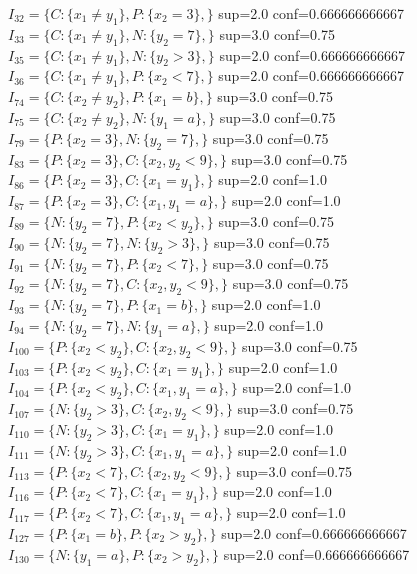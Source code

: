 \documentclass[11pt,a4paper]{article}
\theoremstyle{definition}
\begin{document}
       $I_{32}=\{C:\{x_{1}\neq y_{1}\},P:\{x_{2}=3\},\}$  sup=2.0 conf=0.666666666667\\
       $I_{33}=\{C:\{x_{1}\neq y_{1}\},N:\{y_{2}=7\},\}$  sup=3.0 conf=0.75\\
       $I_{35}=\{C:\{x_{1}\neq y_{1}\},N:\{y_{2}>3\},\}$  sup=2.0 conf=0.666666666667\\
       $I_{36}=\{C:\{x_{1}\neq y_{1}\},P:\{x_{2}<7\},\}$  sup=2.0 conf=0.666666666667\\
       $I_{74}=\{C:\{x_{2}\neq y_{2}\},P:\{x_{1}=b\},\}$  sup=3.0 conf=0.75\\
       $I_{75}=\{C:\{x_{2}\neq y_{2}\},N:\{y_{1}=a\},\}$  sup=3.0 conf=0.75\\
       $I_{79}=\{P:\{x_{2}=3\},N:\{y_{2}=7\},\}$  sup=3.0 conf=0.75\\
       $I_{83}=\{P:\{x_{2}=3\},C:\{x_{2},y_{2}<9\},\}$  sup=3.0 conf=0.75\\
       $I_{86}=\{P:\{x_{2}=3\},C:\{x_{1}=y_{1}\},\}$  sup=2.0 conf=1.0\\
       $I_{87}=\{P:\{x_{2}=3\},C:\{x_{1},y_{1}=a\},\}$  sup=2.0 conf=1.0\\
       $I_{89}=\{N:\{y_{2}=7\},P:\{x_{2}<y_{2}\},\}$  sup=3.0 conf=0.75\\
       $I_{90}=\{N:\{y_{2}=7\},N:\{y_{2}>3\},\}$  sup=3.0 conf=0.75\\
       $I_{91}=\{N:\{y_{2}=7\},P:\{x_{2}<7\},\}$  sup=3.0 conf=0.75\\
       $I_{92}=\{N:\{y_{2}=7\},C:\{x_{2},y_{2}<9\},\}$  sup=3.0 conf=0.75\\
       $I_{93}=\{N:\{y_{2}=7\},P:\{x_{1}=b\},\}$  sup=2.0 conf=1.0\\
       $I_{94}=\{N:\{y_{2}=7\},N:\{y_{1}=a\},\}$  sup=2.0 conf=1.0\\
       $I_{100}=\{P:\{x_{2}<y_{2}\},C:\{x_{2},y_{2}<9\},\}$  sup=3.0 conf=0.75\\
       $I_{103}=\{P:\{x_{2}<y_{2}\},C:\{x_{1}=y_{1}\},\}$  sup=2.0 conf=1.0\\
       $I_{104}=\{P:\{x_{2}<y_{2}\},C:\{x_{1},y_{1}=a\},\}$  sup=2.0 conf=1.0\\
       $I_{107}=\{N:\{y_{2}>3\},C:\{x_{2},y_{2}<9\},\}$  sup=3.0 conf=0.75\\
       $I_{110}=\{N:\{y_{2}>3\},C:\{x_{1}=y_{1}\},\}$  sup=2.0 conf=1.0\\
       $I_{111}=\{N:\{y_{2}>3\},C:\{x_{1},y_{1}=a\},\}$  sup=2.0 conf=1.0\\
       $I_{113}=\{P:\{x_{2}<7\},C:\{x_{2},y_{2}<9\},\}$  sup=3.0 conf=0.75\\
       $I_{116}=\{P:\{x_{2}<7\},C:\{x_{1}=y_{1}\},\}$  sup=2.0 conf=1.0\\
       $I_{117}=\{P:\{x_{2}<7\},C:\{x_{1},y_{1}=a\},\}$  sup=2.0 conf=1.0\\
       $I_{127}=\{P:\{x_{1}=b\},P:\{x_{2}>y_{2}\},\}$  sup=2.0 conf=0.666666666667\\
       $I_{130}=\{N:\{y_{1}=a\},P:\{x_{2}>y_{2}\},\}$  sup=2.0 conf=0.666666666667\\
       
\end{document}
